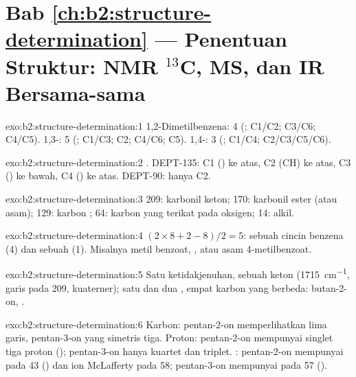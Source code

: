 \section*{Bab \ref{ch:b2:structure-determination} --- Penentuan Struktur: NMR \texorpdfstring{$^{13}$C}{13C}, MS, dan IR Bersama-sama}

\begin{solution}{exo:b2:structure-determination:1}
1,2-Dimetilbenzena: 4 (; C1/C2; C3/C6; C4/C5). 1,3-: 5 (; C1/C3; C2; C4/C6; C5).
1,4-: 3 (; C1/C4; C2/C3/C5/C6).
\end{solution}

\begin{solution}{exo:b2:structure-determination:2}
. DEPT-135: C1 () ke atas, C2 (CH) ke atas, C3 () ke bawah, C4 () ke atas.
DEPT-90: hanya C2.
\end{solution}

\begin{solution}{exo:b2:structure-determination:3}
209: karbonil keton; 170: karbonil ester (atau asam); 129: karbon ;
64: karbon yang terikat pada oksigen; 14:  alkil.
\end{solution}

\begin{solution}{exo:b2:structure-determination:4}
$(2 \times 8 + 2 - 8)/2 = 5$: sebuah cincin benzena (4) dan sebuah 
(1). Misalnya metil benzoat,
, atau asam 4-metilbenzoat.
\end{solution}

\begin{solution}{exo:b2:structure-determination:5}
Satu ketidakjenuhan, sebuah keton (\qty{1715}{cm^{-1}}, garis pada 209,
kuaterner); satu  dan dua
, empat karbon yang berbeda: butan-2-on, .
\end{solution}

\begin{solution}{exo:b2:structure-determination:6}
Karbon: pentan-2-on memperlihatkan lima garis, pentan-3-on yang simetris
tiga. Proton: pentan-2-on mempunyai singlet tiga proton ();
pentan-3-on hanya kuartet dan triplet. : pentan-2-on mempunyai
 pada 43 () dan ion McLafferty pada 58; pentan-3-on
mempunyai  pada 57
().
\end{solution}

